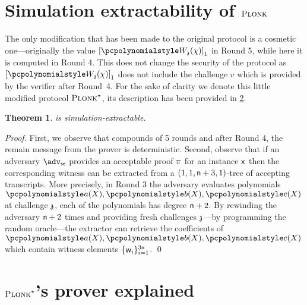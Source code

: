 \documentclass[runningheads,11pt]{llncs}
\newtheorem{theorem}{Theorem}%
\theoremstyle{definition}
\begin{document}
\section{Simulation extractability of $\textsc{Plonk}$}
The only modification that has been made to the original \plonk{} protocol is a cosmetic one---originally the value $\gone{\p{W}_{\chz}(\chi)}$ in Round 5, while here it is computed in Round 4. This does not change the security of the protocol as $\gone{\p{W}_{\chz}(\chi)}$ does not include the challenge $v$ which is provided by the verifier after Round~4. 
For the sake of clarity we denote this little modified protocol $\textsc{Plonk}^\star$, its description has been provided in \cref{sec:plonk_explained}.

\begin{theorem}
	\plonkmod{} is simulation-extractable.
\end{theorem}
\begin{proof}
	First, we observe that \plonkmod{} compounds of 5 rounds and after Round 4, the remain message from the prover is deterministic.
	Second, observe that if an adversary $\adv_\se$ provides an acceptable proof $\pi$ for an instance $\mathsf{x}$ then the corresponding witness can be extracted from a $(1, 1, \mathsf{n} + 3, 1)$-tree of accepting transcripts. More precisely, in Round 3 the adversary evaluates polynomials $\p{a}(X), \p{b}(X), \p{c}(X)$ at challenge $\mathfrak{z}$, each of the polynomials has degree $\mathsf{n} + 2$.
	By rewinding the adversary $\mathsf{n} + 2$ times and providing fresh challenges $\mathfrak{z}$---by programming the random oracle---the extractor can retrieve the coefficients of $\p{a}(X), \p{b}(X), \p{c}(X)$ which contain witness elements $\{\mathsf{w}_i\}_{i = 1}^{3 \mathsf{n}}$.	
	\qed
\end{proof}




\appendix
\section{$\textsc{Plonk}^\star$'s prover explained}
\label{sec:plonk_explained}

\paragraph{}
\end{document}
